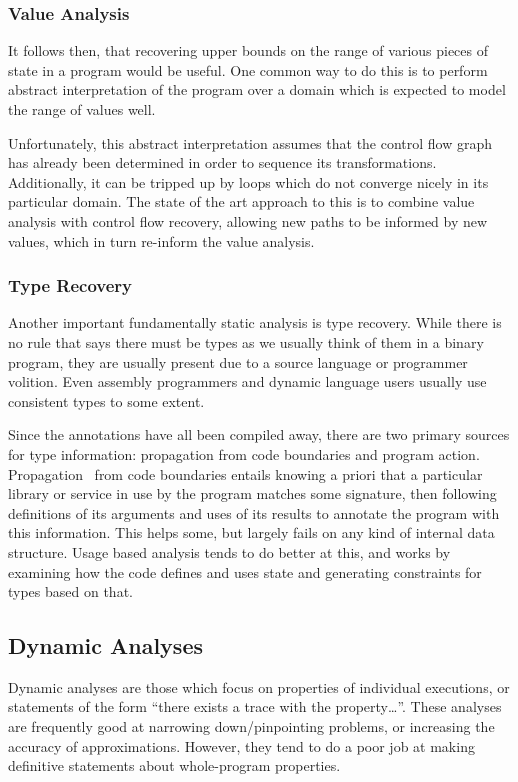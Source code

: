 \subsubsection{Value Analysis}
\label{sec:valanal}
It follows then, that recovering upper bounds on the range of various pieces of state in a program would be useful.
One common way to do this is to perform abstract interpretation of the program over a domain which is expected to model the range of values well.\cite{vsa,wrappedintervals,wrappedintervals2}

Unfortunately, this abstract interpretation assumes that the control flow graph has already been determined in order to sequence its transformations.
Additionally, it can be tripped up by loops which do not converge nicely in its particular domain.
The state of the art approach to this is to combine value analysis with control flow recovery, allowing new paths to be informed by new values, which in turn re-inform the value analysis\cite{jakstab}.

\subsubsection{Type Recovery}
Another important fundamentally static analysis is type recovery.
While there is no rule that says there must be types as we usually think of them in a binary program, they are usually present due to a source language or programmer volition.
Even assembly programmers and dynamic language users\cite{jsinfer} usually use consistent types to some extent.

Since the annotations have all been compiled away, there are two primary sources for type information: propagation from code boundaries and program action.
Propagation~\cite{howard} from code boundaries entails knowing a priori that a particular library or service in use by the program matches some signature, then following definitions of its arguments and uses of its results to annotate the program with this information.
This helps some, but largely fails on any kind of internal data structure.
Usage based analysis\cite{tie,bitr} tends to do better at this, and works by examining how the code defines and uses state and generating constraints for types based on that.

\subsection{Dynamic Analyses}
Dynamic analyses are those which focus on properties of individual executions, or statements of the form ``there exists a trace with the property\ldots''.
These analyses are frequently good at narrowing down/pinpointing problems, or increasing the accuracy of approximations.
However, they tend to do a poor job at making definitive statements about whole-program properties.

